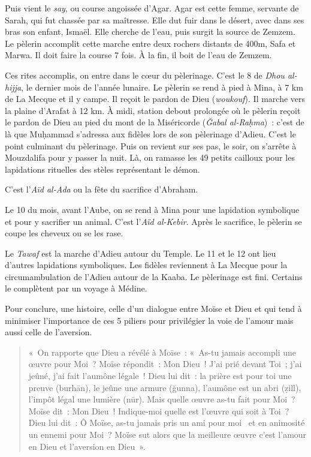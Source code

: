 Puis vient le \emph{say}, ou course angoissée d'Agar. Agar est cette
femme, servante de Sarah, qui fut chassée par sa maîtresse. Elle dut
fuir dans le désert, avec dans ses bras son enfant, Ismaël. Elle cherche
de l'eau, puis surgit la source de Zemzem. Le pèlerin accomplit cette
marche entre deux rochers distants de 400m, Safa et Marwa. Il doit faire
la course 7 fois. À la fin, il boit de l'eau de Zemzem.

Ces rites accomplis, on entre dans le cœur du pèlerinage. C'est le 8 de
\emph{Dhou al-hijja}, le dernier mois de l'année lunaire. Le pèlerin se
rend à pied à Mina, à 7 km de La Mecque et il y campe. Il reçoit le
pardon de Dieu (\emph{woukouf}). Il marche vers la plaine d'Arafat à 12
km. À midi, station debout prolongée où le pèlerin reçoit le pardon de
Dieu au pied du mont de la Miséricorde (\emph{Ğabal al-Raḥma})~: c'est
de là que Muḥammad s'adressa aux fidèles lors de son pèlerinage d'Adieu.
C'est le point culminant du pèlerinage. Puis on revient sur ses pas, le
soir, on s'arrête à Mouzdalifa pour y passer la nuit. Là, on ramasse les
49 petits cailloux pour les lapidations rituelles des stèles
représentant le démon.

C'est l'\emph{Aïd al-Ada} ou la fête du sacrifice d'Abraham.

Le 10 du mois, avant l'Aube, on se rend à Mina pour une lapidation
symbolique et pour y sacrifier un animal. C'est l'\emph{Aïd al-Kebir}.
Après le sacrifice, le pèlerin se coupe les cheveux ou se les rase.

Le \emph{Tawaf} est la marche d'Adieu autour du Temple. Le 11 et le 12
ont lieu d'autres lapidations symboliques. Les fidèles reviennent à La
Mecque pour la circumambulation de l'Adieu autour de la Kaaba. Le
pèlerinage est fini. Certains le complètent par un voyage à Médine.


Pour conclure, une histoire, celle d'un dialogue entre Moïse et Dieu et
qui tend à minimiser l'importance de ces 5 piliers pour privilégier la
voie de l'amour mais aussi celle de l'aversion.

\begin{quote}
«~On rapporte que Dieu a révélé à Moïse~: «~As-tu jamais accompli une
œuvre pour Moi~? Moïse répondit~: Mon Dieu~! J'ai prié devant Toi~; j'ai
jeûné, j'ai fait l'aumône légale~! Dieu lui dit~: la prière est pour toi
une preuve (burhān), le jeûne une armure (ğunna), l'aumône est un abri
(ẓill), l'impôt légal une lumière (nūr). Mais quelle œuvre as-tu fait
pour Moi~? Moïse dit~: Mon Dieu~! Indique-moi quelle est l'œuvre qui
soit à Toi~? Dieu lui dit~: Ô Moïse, as-tu jamais pris un ami pour moi~
et en animosité un ennemi pour Moi~? Moïse sut alors que la meilleure
œuvre c'est l'amour en Dieu et l'aversion en Dieu~».
\end{quote}


